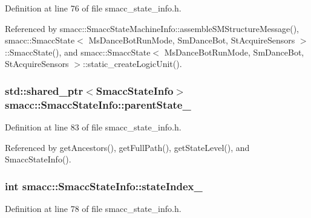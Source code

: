 Definition at line 76 of file smacc\+\_\+state\+\_\+info.\+h.



Referenced by smacc\+::\+Smacc\+State\+Machine\+Info\+::assemble\+S\+M\+Structure\+Message(), smacc\+::\+Smacc\+State$<$ Ms\+Dance\+Bot\+Run\+Mode, Sm\+Dance\+Bot, St\+Acquire\+Sensors $>$\+::\+Smacc\+State(), and smacc\+::\+Smacc\+State$<$ Ms\+Dance\+Bot\+Run\+Mode, Sm\+Dance\+Bot, St\+Acquire\+Sensors $>$\+::static\+\_\+create\+Logic\+Unit().

\subsubsection[{\texorpdfstring{parent\+State\+\_\+}{parentState_}}]{\setlength{\rightskip}{0pt plus 5cm}std\+::shared\+\_\+ptr$<${\bf Smacc\+State\+Info}$>$ smacc\+::\+Smacc\+State\+Info\+::parent\+State\+\_\+}\hypertarget{classsmacc_1_1SmaccStateInfo_ae19f4efbeb2ca665b320df80766d9209}{}\label{classsmacc_1_1SmaccStateInfo_ae19f4efbeb2ca665b320df80766d9209}


Definition at line 83 of file smacc\+\_\+state\+\_\+info.\+h.



Referenced by get\+Ancestors(), get\+Full\+Path(), get\+State\+Level(), and Smacc\+State\+Info().

\subsubsection[{\texorpdfstring{state\+Index\+\_\+}{stateIndex_}}]{\setlength{\rightskip}{0pt plus 5cm}int smacc\+::\+Smacc\+State\+Info\+::state\+Index\+\_\+}\hypertarget{classsmacc_1_1SmaccStateInfo_a43292879ca69576cb835a1cf3f119826}{}\label{classsmacc_1_1SmaccStateInfo_a43292879ca69576cb835a1cf3f119826}


Definition at line 78 of file smacc\+\_\+state\+\_\+info.\+h.

